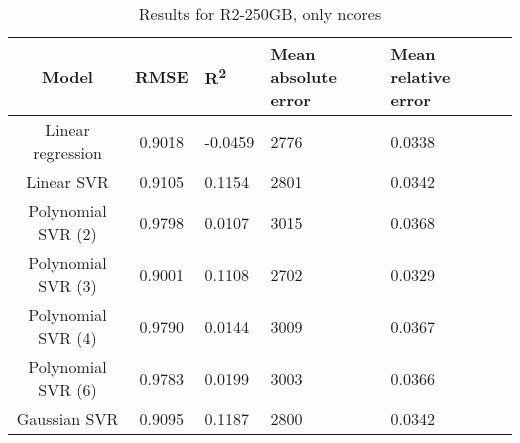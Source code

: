 \begin{table}[H]
\centering
\begin{adjustbox}{center}
\begin{tabular}{c | c M{1.2cm} M{2.5cm} M{2.5cm} M{1.8cm}}
Model & RMSE & R\textsuperscript{2} & Mean absolute error & Mean relative error \tabularnewline
\hline
Linear regression & 0.9018 & -0.0459 &   2776 & 0.0338 \\
Linear SVR & 0.9105 & 0.1154 &   2801 & 0.0342 \\
Polynomial SVR (2) & 0.9798 & 0.0107 &   3015 & 0.0368 \\
Polynomial SVR (3) & 0.9001 & 0.1108 &   2702 & 0.0329 \\
Polynomial SVR (4) & 0.9790 & 0.0144 &   3009 & 0.0367 \\
Polynomial SVR (6) & 0.9783 & 0.0199 &   3003 & 0.0366 \\
Gaussian SVR & 0.9095 & 0.1187 &   2800 & 0.0342 \\
\end{tabular}
\end{adjustbox}
\\
\caption{Results for R2-250GB, only ncores}
\label{tab:only_1_linear_R2_250}
\end{table}
